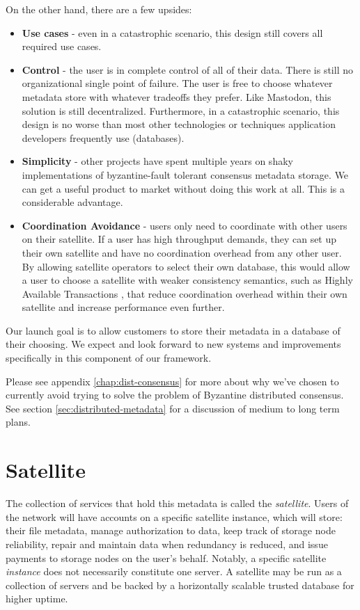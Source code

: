 \documentclass[11pt,fleqn,openany]{book}
\begin{document}
On the other hand, there are a few upsides:
\begin{itemize}
\item {\bf Use cases} - even in a catastrophic scenario, this design still
  covers all required use cases.
\item {\bf Control} - the user is in complete control of all of their data.
  There is still no organizational single point of failure. The user is free
  to choose whatever metadata store with whatever tradeoffs they prefer. Like
  Mastodon\cite{mastodon}, this solution is still decentralized. Furthermore, in a
  catastrophic scenario, this design is no worse than most other technologies or
  techniques application developers frequently use (databases).
\item {\bf Simplicity} - other projects have spent multiple years on shaky
  implementations of byzantine-fault tolerant consensus metadata storage.
  We can get a useful product to market without doing this work at all.
  This is a considerable advantage.
\item {\bf Coordination Avoidance} - users only need to coordinate with
  other users on their satellite. If a user has high throughput demands,
  they can set up their own satellite and have no coordination overhead from
  any other user. By allowing satellite operators to select their own database,
  this would allow a user to choose a satellite with weaker consistency
  semantics, such as Highly Available Transactions \cite{hat}, that reduce
  coordination overhead within their own satellite and increase performance
  even further.
\end{itemize}

Our launch goal is to allow customers to store their metadata in a database of
their choosing. We expect and look forward to new systems and improvements
specifically in this component of our framework.

Please see appendix \ref{chap:dist-consensus} for more about why we've chosen
to currently avoid trying to solve the problem of Byzantine distributed consensus.
See section \ref{sec:distributed-metadata} for a discussion of medium to
long term plans.

\section{Satellite}

The collection of services that hold this metadata is called the
{\em satellite}. Users of the network will have accounts on a specific
satellite instance, which will store: their file metadata, manage authorization
to data, keep track of storage node reliability, repair and maintain data when
redundancy is reduced, and issue payments to storage nodes on the user's behalf.
Notably, a specific satellite {\em instance} does not necessarily constitute one
server. A satellite may be run as a collection of servers and be backed by
a horizontally scalable trusted database for higher uptime.
\end{document}
